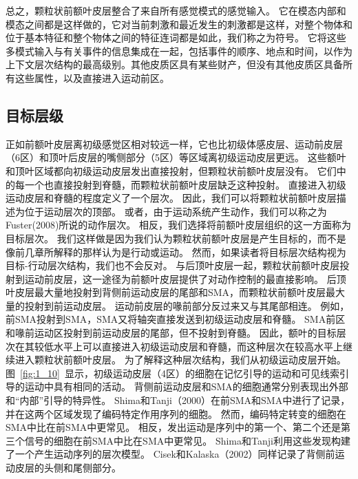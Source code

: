 总之，颗粒状前额叶皮层整合了来自所有感觉模式的感觉输入。
它在模态内部和模态之间都是这样做的，它对当前刺激和最近发生的刺激都是这样，对整个物体和位于基本特征和整个物体之间的特征连词都是如此，我们称之为符号。
它将这些多模式输入与有关事件的信息集成在一起，包括事件的顺序、地点和时间，以作为上下文层次结构的最高级别。其他皮质区具有某些财产，但没有其他皮质区具备所有这些属性，以及直接进入运动前区。



\subsection{目标层级}
\par
正如前额叶皮层离初级感觉区相对较远一样，它也比初级体感皮层、运动前皮层（6区）和顶叶后皮层的嘴侧部分（5区）等区域离初级运动皮层更远。
这些额叶和顶叶区域都向初级运动皮层发出直接投射，但颗粒状前额叶皮层没有\cite{jones1970anatomical,lu1994interconnections}。
它们中的每一个也直接投射到脊髓，而颗粒状前额叶皮层缺乏这种投射\cite{murray1991contributions}。
直接进入初级运动皮层和脊髓的程度定义了一个层次。
因此，我们可以将颗粒状前额叶皮层描述为位于运动层次的顶部。
或者，由于运动系统产生动作，我们可以称之为Fuster(2008)所说的动作层次。
相反，我们选择将前额叶皮层组织的这一方面称为目标层次。
我们这样做是因为我们认为颗粒状前额叶皮层是产生目标的，而不是像前几章所解释的那样认为是行动或运动。
然而，如果读者将目标层次结构视为目标-行动层次结构，我们也不会反对。
与后顶叶皮层一起，颗粒状前额叶皮层投射到运动前皮层，这一途径为前额叶皮层提供了对动作控制的最直接影响。
后顶叶皮层最大量地投射到背侧前运动皮层的尾部和SMA，而颗粒状前额叶皮层最大量的投射到前运动皮层\cite{rizzolatti2001cortical,luppino2003prefrontal}。
运动前皮层的喙前部分反过来又与其尾部相连。
例如，前SMA投射到SMA，SMA又将轴突直接发送到初级运动皮层\cite{luppino1993corticocortical}和脊髓\cite{murray1981organization}。
SMA前区和喙前运动区投射到前运动皮层的尾部，但不投射到脊髓\cite{he1995topographic}。
因此，额叶的目标层次在其较低水平上可以直接进入初级运动皮层和脊髓，而这种层次在较高水平上继续进入颗粒状前额叶皮层。
为了解释这种层次结构，我们从初级运动皮层开始。
图~\ref{fig:1_10}~显示，初级运动皮层（4区）的细胞在记忆引导的运动和可见线索引导的运动中具有相同的活动。
背侧前运动皮层和SMA的细胞通常分别表现出外部和“内部”引导的特异性。
Shima和Tanji（2000）在前SMA和SMA中进行了记录，并在这两个区域发现了编码特定作用序列的细胞。
然而，编码特定转变的细胞在SMA中比在前SMA中更常见。
相反，发出运动是序列中的第一个、第二个还是第三个信号的细胞在前SMA中比在SMA中更常见。
Shima和Tanji利用这些发现构建了一个产生运动序列的层次模型。
Cisek和Kalaska（2002）同样记录了背侧前运动皮层的头侧和尾侧部分。
